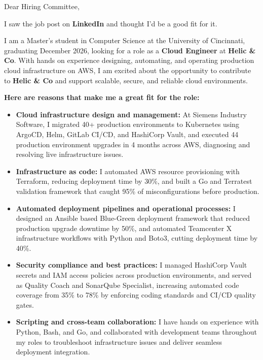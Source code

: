\documentclass[11pt]{letter}
\date{}
\begin{document}
\begin{letter}{}

\opening{Dear Hiring Committee,}

I saw the job post on \textbf{LinkedIn} and thought I'd be a good fit for it.

I am a Master's student in Computer Science at the University of Cincinnati, graduating December 2026, looking for a role as a \textbf{Cloud Engineer} at \textbf{Helic \& Co}. With hands on experience designing, automating, and operating production cloud infrastructure on AWS, I am excited about the opportunity to contribute to \textbf{Helic \& Co} and support scalable, secure, and reliable cloud environments.

\textbf{Here are reasons that make me a great fit for the role:}

\begin{itemize}[leftmargin=*, itemsep=0.45em]
    \item \textbf{Cloud infrastructure design and management:} At Siemens Industry Software, I migrated 40+ production environments to Kubernetes using ArgoCD, Helm, GitLab CI/CD, and HashiCorp Vault, and executed 44 production environment upgrades in 4 months across AWS, diagnosing and resolving live infrastructure issues.

    \item \textbf{Infrastructure as code:} I automated AWS resource provisioning with Terraform, reducing deployment time by 30\%, and built a Go and Terratest validation framework that caught 95\% of misconfigurations before production.

    \item \textbf{Automated deployment pipelines and operational processes:} I designed an Ansible based Blue-Green deployment framework that reduced production upgrade downtime by 50\%, and automated Teamcenter X infrastructure workflows with Python and Boto3, cutting deployment time by 40\%.

    \item \textbf{Security compliance and best practices:} I managed HashiCorp Vault secrets and IAM access policies across production environments, and served as Quality Coach and SonarQube Specialist, increasing automated code coverage from 35\% to 78\% by enforcing coding standards and CI/CD quality gates.

    \item \textbf{Scripting and cross-team collaboration:} I have hands on experience with Python, Bash, and Go, and collaborated with development teams throughout my roles to troubleshoot infrastructure issues and deliver seamless deployment integration.
\end{itemize}


\end{letter}
\end{document}
